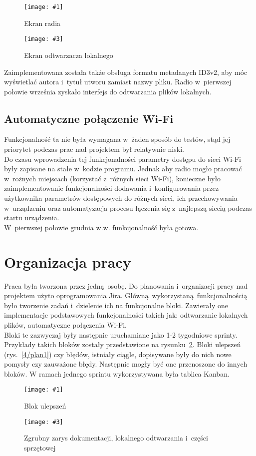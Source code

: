 \documentclass[polish]{aghengthesis}
\newcommand{\imgintss}[5]{
	\begin{figure}[{#5}]
		\centering
		\begin{minipage}{.45\textwidth}
			\centering
			\texttt{[image: \#1]}
			\caption{#2}
			\label{#1}
		\end{minipage}%
		\hfill
		\begin{minipage}{.45\textwidth}
			\centering
			\texttt{[image: \#3]}
			\caption{#4}
			\label{#3}
		\end{minipage}
	\end{figure}
}
\newcommand{\imghss}[4]{\imgintss{#1}{#2}{#3}{#4}{H}}
\begin{document}
			\imghss{4/scr_radio}{Ekran radia}{4/scr_player}{Ekran odtwarzacza lokalnego}
			
			Zaimplementowana została także obsługa formatu metadanych ID3v2, aby móc wyświetlać autora i~tytuł utworu zamiast nazwy pliku. Radio w~pierwszej połowie września zyskało interfejs do odtwarzania plików lokalnych.
			
		\subsection{Automatyczne połączenie Wi-Fi}
			Funkcjonalność ta nie była wymagana w~żaden sposób do testów, stąd jej priorytet podczas prac nad projektem był relatywnie niski. 
			$ $\\

			 Do czasu wprowadzenia tej funkcjonalności parametry dostępu do sieci Wi-Fi były zapisane na stałe w~kodzie programu.
			 Jednak aby radio mogło pracować w~rożnych miejscach (korzystać z~różnych sieci Wi-Fi), konieczne było
			 zaimplementowanie funkcjonalności dodawania i~konfigurowania przez użytkownika parametrów dostępowych do różnych sieci, ich przechowywania w~urządzeniu oraz automatyzacja procesu łączenia się z~najlepszą siecią podczas startu urządzenia.
			 $ $\\
			 
			 W~pierwszej połowie grudnia w.w. funkcjonalność była gotowa.
			 
	 \section{Organizacja pracy}
		Praca była tworzona przez jedną osobę.
		Do planowania i~organizacji pracy nad projektem użyto oprogramowania Jira. Główną wykorzystaną funkcjonalnością było tworzenie zadań i~dzielenie ich na funkcjonalne bloki. Zawierały one implementacje podstawowych funkcjonalności takich jak: odtwarzanie lokalnych plików, automatyczne połączenia Wi-Fi.
		$ $\\
		
		Bloki te zazwyczaj były następnie uruchamiane jako 1-2 tygodniowe sprinty. Przykłady takich bloków zostały przedstawione na rysunku~\ref{4/plan2}. Bloki ulepszeń (rys.~\ref{4/plan1}) czy błędów, istniały ciągle, dopisywane były do nich nowe pomysły czy zauważone błędy. Następnie mogły być one przenoszone do innych bloków.
		W ramach jednego sprintu wykorzystywana była tablica Kanban.
 		\imghss{4/plan1}{Blok ulepszeń}{4/plan2}{Zgrubny zarys dokumentacji, lokalnego odtwarzania i~części sprzętowej}
		 
\end{document}
